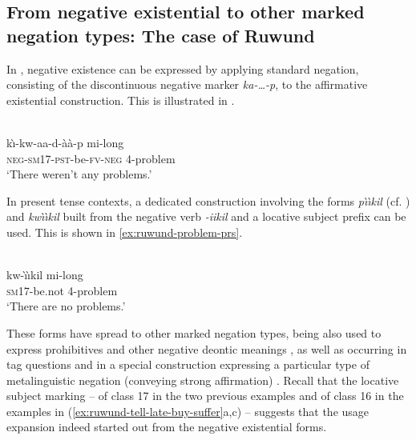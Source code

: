 \documentclass[output=paper,draft,draftmode,colorlinks,citecolor=brown]{langscibook}
\begin{document}
\subsection{From negative existential to other marked negation types: The
case of Ruwund}\label{sec:1:6.2}
%
In , negative existence can be expressed by applying standard
negation, consisting of the discontinuous negative marker
\textit{ka-\ldots{}-p}, to the affirmative existential construction. This
is illustrated in .
%

\ea\label{ex:ruwund-problem-pst} \\
\gll k{\`\i}-kw-aa-d-{\`a}{\`a}-p mi-long\\
\textsc{neg-sm17-pst}-be-\textsc{fv-neg} 4-problem\\
\glt 	`There weren’t
any problems.'
\z

%
In present tense contexts, a dedicated construction involving the forms
\textit{p{\`\i}{\`\i}kil} (cf. ) and
\textit{kw{\`\i}{\`\i}kil} built from the negative verb \textit{-iikil} and
a locative subject prefix can be used. This is shown in \ref{ex:ruwund-problem-prs}.
%

\ea\label{ex:ruwund-problem-prs} \\
\gll kw-{\`\i}{\`\i}kil mi-long\\
\textsc{sm}17-be.not  4-problem\\
\glt 	`There are no problems.'
\z

%
These forms have spread to other marked negation types, being also
used to express prohibitives  and other negative
deontic meanings , as well as occurring in tag
questions  and in a special construction expressing a
particular type of metalinguistic negation (conveying strong affirmation)
. Recall that the locative subject marking -- of
class 17 in the two previous examples and of class 16 in the examples in
(\ref{ex:ruwund-tell-late-buy-suffer}a,c)
-- suggests that the usage expansion indeed started out from the negative
existential forms.
%

\ea\label{ex:ruwund-tell-late-buy-suffer} 
%
\end{document}
